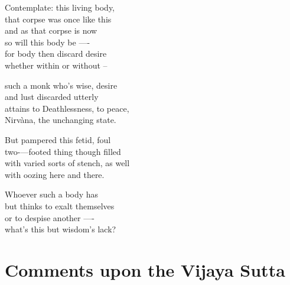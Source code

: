 \begin{MyDescription}{}
   Contemplate: this living body,\\
   that corpse was once like this\\
   and as that corpse is now\\
   so will this body be —-\\
   for body then discard desire\\
   whether within or without --
\end{MyDescription}

\begin{MyDescription}{}
such a monk who's wise, desire\\
and lust discarded utterly\\
attains to Deathlessness, to peace,\\
Nirv\`ana, the unchanging state.
\end{MyDescription}

\begin{MyDescription}{}
But pampered this fetid, foul\\
two-—footed thing though ﬁlled\\
with varied sorts of stench, as well\\
with oozing here and there.
\end{MyDescription}

\begin{MyDescription}{}
Whoever such a body has\\
but thinks to exalt themselves\\
or to despise another —-\\
what's this but wisdom's lack?
\end{MyDescription}

\begin{MyDescription}[(Sn. 193--206)]{}
\end{MyDescription}    
\newpage
\section{Comments upon the Vijaya Sutta}

